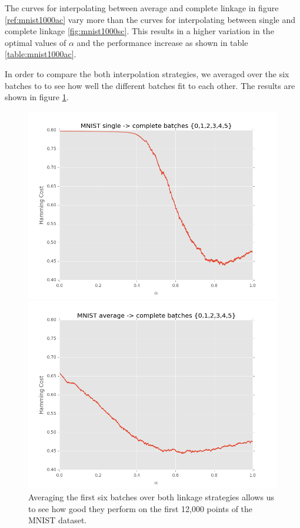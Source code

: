 The curves for interpolating between average and complete linkage in figure \ref{ref:mnist1000ac} vary more than the curves for interpolating between single and complete linkage \ref{fig:mnist1000sc}. This results in a higher variation in the optimal values of $\alpha$ and the performance increase as shown in table \ref{table:mnist1000ac}.

In order to compare the both interpolation strategies, we averaged over the six batches to to see how well the different batches fit to each other. The results are shown in figure \ref{fig:mnist1000avg}.

\begin{figure}[h]
\centering
\begin{minipage}{.45\textwidth}
  \centering
  \includegraphics[width=\linewidth]{images/mnist-sc-averaged}
\end{minipage}
\begin{minipage}{.45\textwidth}
  \centering
  \includegraphics[width=\linewidth]{images/mnist-ac-averaged}
\end{minipage}
\caption{Averaging the first six batches over both linkage strategies allows us to see how good they perform on the first 12,000 points of the MNIST dataset.}
\label{fig:mnist1000avg}
\end{figure}

